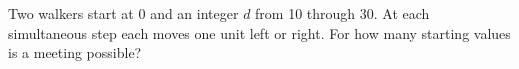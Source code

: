 Two walkers start at 0 and an integer $d$ from 10 through 30. At each simultaneous step each moves one unit left or right. For how many starting values is a meeting possible?
